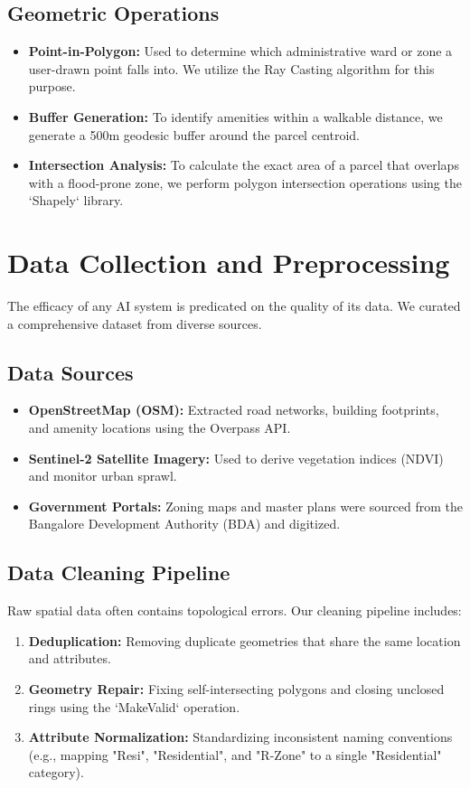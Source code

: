 \documentclass[12pt,a4paper]{report}
\begin{document}
\subsection{Geometric Operations}
\begin{itemize}
    \item \textbf{Point-in-Polygon:} Used to determine which administrative ward or zone a user-drawn point falls into. We utilize the Ray Casting algorithm for this purpose.
    \item \textbf{Buffer Generation:} To identify amenities within a walkable distance, we generate a 500m geodesic buffer around the parcel centroid.
    \item \textbf{Intersection Analysis:} To calculate the exact area of a parcel that overlaps with a flood-prone zone, we perform polygon intersection operations using the `Shapely` library.
\end{itemize}

\section{Data Collection and Preprocessing}
The efficacy of any AI system is predicated on the quality of its data. We curated a comprehensive dataset from diverse sources.

\subsection{Data Sources}
\begin{itemize}
    \item \textbf{OpenStreetMap (OSM):} Extracted road networks, building footprints, and amenity locations using the Overpass API.
    \item \textbf{Sentinel-2 Satellite Imagery:} Used to derive vegetation indices (NDVI) and monitor urban sprawl.
    \item \textbf{Government Portals:} Zoning maps and master plans were sourced from the Bangalore Development Authority (BDA) and digitized.
\end{itemize}

\subsection{Data Cleaning Pipeline}
Raw spatial data often contains topological errors. Our cleaning pipeline includes:
\begin{enumerate}
    \item \textbf{Deduplication:} Removing duplicate geometries that share the same location and attributes.
    \item \textbf{Geometry Repair:} Fixing self-intersecting polygons and closing unclosed rings using the `MakeValid` operation.
    \item \textbf{Attribute Normalization:} Standardizing inconsistent naming conventions (e.g., mapping "Resi", "Residential", and "R-Zone" to a single "Residential" category).
\end{enumerate}
\end{document}
